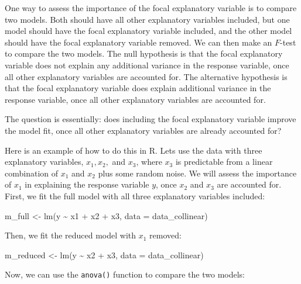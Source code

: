 \documentclass[
  letterpaper,
  8pt,
  a4paper]{book}
\newenvironment{Shaded}{\begin{snugshade}}{\end{snugshade}}
\newcommand{\AttributeTok}[1]{\textcolor[rgb]{0.40,0.45,0.13}{#1}}
\newcommand{\FunctionTok}[1]{\textcolor[rgb]{0.28,0.35,0.67}{#1}}
\newcommand{\NormalTok}[1]{\textcolor[rgb]{0.00,0.23,0.31}{#1}}
\newcommand{\OtherTok}[1]{\textcolor[rgb]{0.00,0.23,0.31}{#1}}
\newcommand{\SpecialCharTok}[1]{\textcolor[rgb]{0.37,0.37,0.37}{#1}}
\begin{document}
One way to assess the importance of the focal explanatory variable is to
compare two models. Both should have all other explanatory variables
included, but one model should have the focal explanatory variable
included, and the other model should have the focal explanatory variable
removed. We can then make an \(F\)-test to compare the two models. The
null hypothesis is that the focal explanatory variable does not explain
any additional variance in the response variable, once all other
explanatory variables are accounted for. The alternative hypothesis is
that the focal explanatory variable does explain additional variance in
the response variable, once all other explanatory variables are
accounted for.

The question is essentially: does including the focal explanatory
variable improve the model fit, once all other explanatory variables are
already accounted for?

Here is an example of how to do this in R. Lets use the data with three
explanatory variables, \(x_1, x_2,\) and \(x_3\), where \(x_3\) is
predictable from a linear combination of \(x_1\) and \(x_2\) plus some
random noise. We will assess the importance of \(x_1\) in explaining the
response variable \(y\), once \(x_2\) and \(x_3\) are accounted for.
First, we fit the full model with all three explanatory variables
included:

\begin{Shaded}
\begin{Highlighting}[]
\NormalTok{m\_full }\OtherTok{\textless{}{-}} \FunctionTok{lm}\NormalTok{(y }\SpecialCharTok{\textasciitilde{}}\NormalTok{ x1 }\SpecialCharTok{+}\NormalTok{ x2 }\SpecialCharTok{+}\NormalTok{ x3, }\AttributeTok{data =}\NormalTok{ data\_collinear)}
\end{Highlighting}
\end{Shaded}

Then, we fit the reduced model with \(x_1\) removed:

\begin{Shaded}
\begin{Highlighting}[]
\NormalTok{m\_reduced }\OtherTok{\textless{}{-}} \FunctionTok{lm}\NormalTok{(y }\SpecialCharTok{\textasciitilde{}}\NormalTok{ x2 }\SpecialCharTok{+}\NormalTok{ x3, }\AttributeTok{data =}\NormalTok{ data\_collinear)}
\end{Highlighting}
\end{Shaded}

Now, we can use the \texttt{anova()} function to compare the two models:
\end{document}
